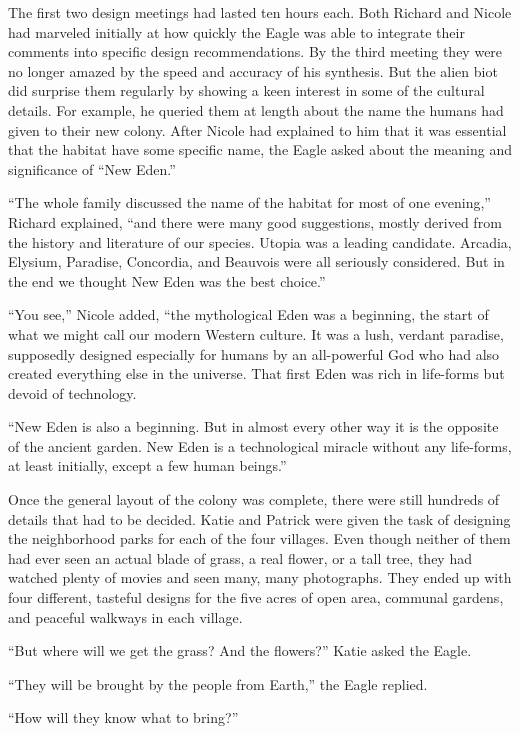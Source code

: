 \documentclass[]{article}
\begin{document}
{The first two design meetings had lasted ten hours each.  Both Richard and Nicole had marveled initially at how quickly the Eagle was able to integrate their comments into specific design recommendations.  By the third meeting they were no longer amazed by the speed and accuracy of his synthesis.  But the alien biot did surprise them regularly by showing a keen interest in some of the cultural details.  For example, he queried them at length about the name the humans had given to their new colony.  After Nicole had explained to him that it was essential that the habitat have some specific name, the Eagle asked about the meaning and significance of “New Eden.”

“The whole family discussed the name of the habitat for most of one evening,” Richard explained, “and there were many good suggestions, mostly derived from the history and literature of our species.  Utopia was a leading candidate.  Arcadia, Elysium, Paradise, Concordia, and Beauvois were all seriously considered.  But in the end we thought New Eden was the best choice.”

“You see,” Nicole added, “the mythological Eden was a beginning, the start of what we might call our modern Western culture.  It was a lush, verdant paradise, supposedly designed especially for humans by an all-powerful God who had also created everything else in the universe.  That first Eden was rich in life-forms but devoid of technology.

“New Eden is also a beginning.  But in almost every other way it is the opposite of the ancient garden.  New Eden is a technological miracle without any life-forms, at least initially, except a few human beings.”

Once the general layout of the colony was complete, there were still hundreds of details that had to be decided.  Katie and Patrick were given the task of designing the neighborhood parks for each of the four villages.  Even though neither of them had ever seen an actual blade of grass, a real flower, or a tall tree, they had watched plenty of movies and seen many, many photographs.  They ended up with four different, tasteful designs for the five acres of open area, communal gardens, and peaceful walkways in each village.

“But where will we get the grass? And the flowers?” Katie asked the Eagle.

“They will be brought by the people from Earth,” the Eagle replied.

“How will they know what to bring?”

}
\end{document}
